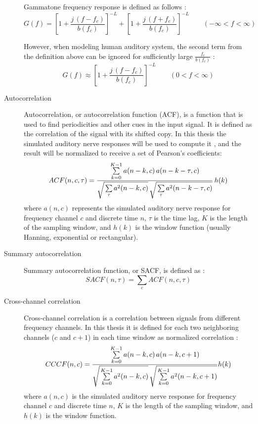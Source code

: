 \begin{description}
	Gammatone frequency response is defined as follows \cite{Holdsworth1988}:
	\begin{equation}
		G(f) = \left[1 + \frac{j\,(f - f_c)}{b(f_c)}\right]^{-L} + 
		\left[1 + \frac{j\,(f + f_c)}{b(f_c)}\right]^{-L}
		\qquad\left(-\infty < f < \infty\right)
	\end{equation}
	
	However, when modeling human auditory system, the second term from the definition above can be ignored for sufficiently large $\frac{f_c}{b(f_c)}$ \cite{Wang2006}\cite{Holdsworth1988}:
	\begin{equation}
		G(f)\approx\left[1 + \frac{j\,(f - f_c)}{b(f_c)}\right]^{-L}
		\qquad\left(0 < f < \infty\right)
	\end{equation}
	
	\item[Autocorrelation] Autocorrelation, or autocorrelation function (ACF), is a function that is used to find periodicities and other cues in the input signal. It is defined as the correlation of the signal with its shifted copy. In this thesis the simulated auditory nerve responses will be used to compute it \cite{Wang2006}, and the result will be normalized to receive a set of Pearson's coefficients:
	\begin{equation}
		ACF(n, c, \tau) = \frac{
			\sum\limits_{k=0}^{K-1}a(n - k, c)\,a(n - k -\tau, c)
		}{
			\sqrt{\strut\sum\limits_{\tau}{a^2(n - k, c)}}\,
			\sqrt{\strut\sum\limits_{\tau}{a^2(n - k - \tau, c)}}
		}\,h(k)
	\label{equation:ACF}
	\end{equation}
	where $a(n, c)$ represents the simulated auditory nerve response for frequency channel $c$ and discrete time $n$, $\tau$ is the time lag, $K$ is the length of the sampling window, and $h(k)$ is the window function (usually Hanning, exponential or rectangular).
	
	\item[Summary autocorrelation] Summary autocorrelation function, or SACF, is defined as \cite{Wang2006}\cite{Wang2012}:
	\begin{equation}
		SACF(n, \tau) = \sum_c{ACF(n, c, \tau)}
		\label{equation:SACF}
	\end{equation}
	
	\item[Cross-channel correlation] Cross-channel correlation is a correlation between signals from different frequency channels. In this thesis it is defined for each two neighboring channels ($c$ and $c + 1$) in each time window as normalized correlation \cite{Wang2006}\cite{Wang2012}:
	\begin{equation}
		CCCF(n, c) = \frac{
			\sum\limits_{k=0}^{K-1}a(n - k, c)\,a(n - k, c + 1)
		}{
			\sqrt{\strut\sum\limits_{k=0}^{K-1}{a^2(n - k, c)}}\,
			\sqrt{\strut\sum\limits_{k=0}^{K-1}{a^2(n - k, c + 1)}}
		}h(k)
		\label{equation:CCCF}
	\end{equation}
	where $a(n, c)$ is the simulated auditory nerve response for frequency channel $c$ and discrete time $n$, $K$ is the length of the sampling window, and $h(k)$ is the window function.
\end{description}

